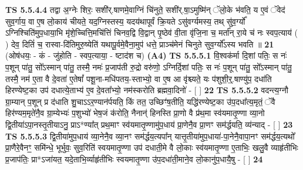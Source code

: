 \documentclass[17pt]{extarticle}
\begin{document}
                  \newline
                                \textbf{ TS 5.5.4.4} \newline
                  तद्वा अ॒ग्नेः शिरः॒ सशी॑र्.षाणमे॒वाग्निं चि॑नुते॒ सशी॑र्.षा॒ऽमुष्मि॑न् ॅलो॒के भ॑वति॒ य ए॒वं ॅवेद॑ सुव॒र्गाय॒ वा ए॒ष लो॒काय॑ चीयते॒ यद॒ग्निस्तस्य॒ यदय॑थापूर्वं क्रि॒यते ऽसु॑वर्ग्यमस्य॒ तथ् सु॑व॒र्ग्यो᳚ ऽग्निश्चिति॑मुप॒धाया॒भि मृ॑शे॒च्चित्ति॒मचि॑त्तिं चिनव॒द्वि वि॒द्वान् पृ॒ष्ठेव॑ वी॒ता वृ॑जि॒ना च॒ मर्ता᳚न् रा॒ये च॑ नः स्वप॒त्याय॑ ( ) देव॒ दितिं॑ च॒ रास्वा-दि॑तिमुरु॒ष्येति॑ यथापू॒र्वमे॒वैना॒मुप॑ धत्ते॒ प्राञ्च॑मेनं चिनुते सुव॒र्ग्यो᳚ऽस्य भवति ॥ \textbf{  21 } \newline
                  \newline
                      (ओष॑धयः॒ - कं - जु॑होति - स्वप॒त्याया॒ - ष्टाद॑श च)  \textbf{(A4)} \newline \newline
                                        \textbf{ TS 5.5.5.1} \newline
                  वि॒श्वक॑र्मा दि॒शां पतिः॒ स नः॑ प॒शून् पा॑तु॒ सो᳚ऽस्मान् पा॑तु॒ तस्मै॒ नमः॑ प्र॒जाप॑ती रु॒द्रो वरु॑णो॒ ऽग्निर्दि॒शां पतिः॒ स नः॑ प॒शून् पा॑तु॒ सो᳚ऽस्मान् पा॑तु॒ तस्मै॒ नम॑ ए॒ता वै दे॒वता॑ ए॒तेषां᳚ पशू॒ना-मधि॑पतय॒-स्ताभ्यो॒ वा ए॒ष आ वृ॑श्च्यते॒ यः प॑शुशी॒र्॒.षाण्यु॑प॒ दधा॑ति हिरण्येष्ट॒का उप॑ दधात्ये॒ताभ्य॑ ए॒व दे॒वता᳚भ्यो॒ नम॑स्करोति ब्रह्मवा॒दिनो॑ - [  ] \textbf{  22} \newline
                  \newline
                                \textbf{ TS 5.5.5.2} \newline
                  वदन्त्य॒ग्नौ ग्रा॒म्यान् प॒शून् प्र द॑धाति शु॒चाऽऽर॒ण्यान॑र्पयति॒ किं तत॒ उच्छिꣳ॑ष॒तीति॒ यद्धि॑रण्येष्ट॒का उ॑प॒दधा᳚त्य॒मृतं॒ ॅवै हिर॑ण्यम॒मृते॑नै॒व ग्रा॒म्येभ्यः॑ प॒शुभ्यो॑ भेष॒जं क॑रोति॒ नैनान्॑ हिनस्ति प्रा॒णो वै प्र॑थ॒मा स्व॑यमातृ॒ण्णा व्या॒नो द्वि॒तीया॑ऽपा॒नस्तृ॒तीयाऽनु॒ प्राऽ*ण्या᳚त् प्रथ॒माꣳ स्व॑यमातृ॒ण्णामु॑प॒धाय॑ प्रा॒णेनै॒व प्रा॒णꣳ सम॑र्द्धयति॒ व्य॑न्याद् - [  ] \textbf{  23} \newline
                  \newline
                                \textbf{ TS 5.5.5.3} \newline
                  द्वि॒तीया॑मुप॒धाय॑ व्या॒नेनै॒व व्या॒नꣳ सम॑र्द्धय॒त्यपा᳚न् यात्तृ॒तीया॑मुप॒धाया॑-पा॒नेनै॒वापा॒नꣳ सम॑र्द्धय॒त्यथो᳚ प्रा॒णैरे॒वैनꣳ॒॒ समि॑न्धे॒ भूर्भुवः॒ सुव॒रिति॑ स्वयमातृ॒ण्णा उप॑ दधाती॒मे वै लो॒काः स्व॑यमातृ॒ण्णा ए॒ताभिः॒ खलु॒वै व्याहृ॑तीभिः प्र॒जाप॑तिः॒ प्रा*ऽजा॑यत॒ यदे॒ताभि॒र्व्याहृ॑तीभिः स्वयमातृ॒ण्णा उ॑प॒दधा॑ती॒माने॒व लो॒कानु॑प॒धायै॒षु - [  ] \textbf{  24} \newline
\end{document}
